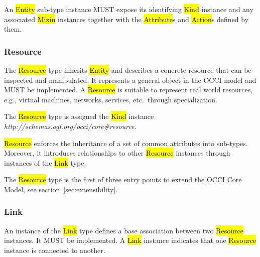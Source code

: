 \documentclass[10pt,a4paper]{article}
\begin{document}
An \hl{Entity} sub-type instance MUST expose its identifying \hl{Kind}
instance and any associated \hl{Mixin} instances together with the
\hl{Attribute}s and \hl{Action}s defined by them.

\subsubsection{Resource}
\label{sec:resource}
The \hl{Resource} type inherits \hl{Entity} and describes a concrete
resource that can be inspected and manipulated. It represents a
general object in the OCCI model and MUST be implemented. A
\hl{Resource} is suitable to represent real world resources,
e.g., virtual machines, networks, services, etc.~through
specialization.


The \hl{Resource} type is assigned the \hl{Kind} instance
\textit{http://schemas.ogf.org/occi/core\#resource}.

\hl{Resource} enforces the inheritance of a set of common attributes
into sub-types. Moreover, it introduces relationships to other
\hl{Resource} instances through instances of the \hl{Link} type.

The \hl{Resource} type is the first of three entry points to extend
the OCCI Core Model, see section~\ref{sec:extensibility}.

\subsubsection{Link}
\label{sec:link}
An instance of the \hl{Link} type defines a base association between
two \hl{Resource} instances. It MUST be implemented. A \hl{Link}
instance indicates that one \hl{Resource} instance is connected to
another.
\end{document}
